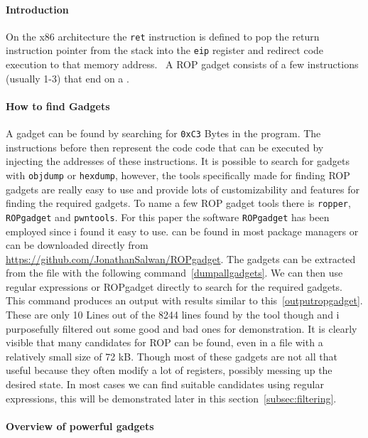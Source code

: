 \documentclass[journal=tosc,submission, notanonymous]{iacrtrans}
\begin{document}
\paragraph{Introduction}
On the x86 architecture the \Verb+ret+ instruction is defined to pop the return instruction pointer from the stack into the \Verb+eip+ register and redirect code execution to that memory address.~\cite{retx86} A ROP gadget consists of a few instructions (usually 1-3) that end on a .

\paragraph{How to find Gadgets}
\label{par:ropgadget}
A gadget can be found by searching for \Verb+0xC3+ Bytes in the program. The instructions before then represent the code code that can be executed by injecting the addresses of these instructions. It is possible to search for gadgets with \Verb+objdump+ or \Verb+hexdump+, however, the tools specifically made for finding ROP gadgets are really easy to use and provide lots of customizability and features for finding the required gadgets. To name a few ROP gadget tools there is \Verb+ropper+, \Verb+ROPgadget+ and \Verb+pwntools+. For this paper the software \Verb+ROPgadget+ has been employed since i found it easy to use.  can be found in most package managers or can be downloaded directly from \url{https://github.com/JonathanSalwan/ROPgadget}. The gadgets can be extracted from the file with the following command~\cref{dumpallgadgets}. We can then use regular expressions or ROPgadget directly to search for the required gadgets.
This command produces an output with results similar to this~\cref{outputropgadget}.
These are only 10 Lines out of the 8244 lines found by the tool though and i purposefully filtered out some good and bad ones for demonstration. It is clearly visible that many candidates for ROP can be found, even in a file with a relatively small size of 72 kB. Though most of these gadgets are not all that useful because they often modify a lot of registers, possibly messing up the desired state. In most cases we can find suitable candidates using regular expressions, this will be demonstrated later in this section~\cref{subsec:filtering}.
\paragraph{Overview of powerful gadgets}
\end{document}
